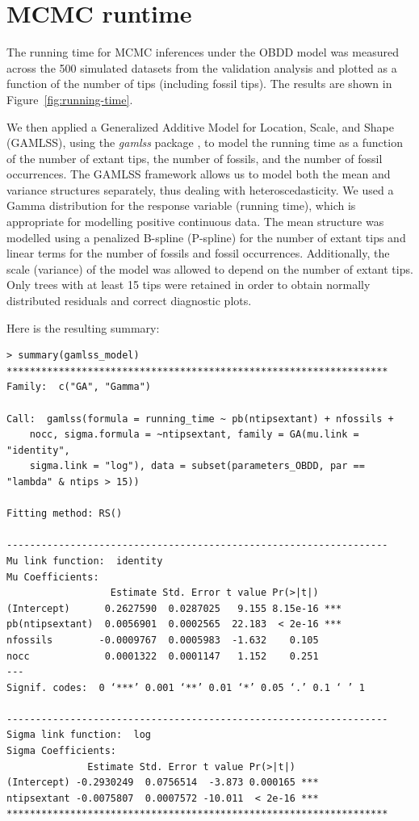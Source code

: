 \documentclass[oupdraft]{sysbio}
\begin{document}
\section{MCMC runtime} \label{SM-runtime}

The running time for MCMC inferences under the OBDD model was measured across the 500 simulated datasets from the validation analysis and plotted as a function of the number of tips (including fossil tips). The results are shown in Figure~\ref{fig:running-time}.

We then applied a Generalized Additive Model for Location, Scale, and Shape (GAMLSS), using the \textit{gamlss} package \citep{rigby_generalized_2005, r_core_team_r_2018}, to model the running time as a function of the number of extant tips, the number of fossils, and the number of fossil occurrences. The GAMLSS framework allows us to model both the mean and variance structures separately, thus dealing with heteroscedasticity. We used a Gamma distribution for the response variable (running time), which is appropriate for modelling positive continuous data. The mean structure was modelled using a penalized B-spline (P-spline) for the number of extant tips and linear terms for the number of fossils and fossil occurrences. Additionally, the scale (variance) of the model was allowed to depend on the number of extant tips. Only trees with at least 15 tips were retained in order to obtain normally distributed residuals and correct diagnostic plots.

Here is the resulting summary:
\begin{verbatim}
> summary(gamlss_model)
******************************************************************
Family:  c("GA", "Gamma") 

Call:  gamlss(formula = running_time ~ pb(ntipsextant) + nfossils +  
    nocc, sigma.formula = ~ntipsextant, family = GA(mu.link = "identity",  
    sigma.link = "log"), data = subset(parameters_OBDD, par == "lambda" & ntips > 15)) 

Fitting method: RS() 

------------------------------------------------------------------
Mu link function:  identity
Mu Coefficients:
                  Estimate Std. Error t value Pr(>|t|)    
(Intercept)      0.2627590  0.0287025   9.155 8.15e-16 ***
pb(ntipsextant)  0.0056901  0.0002565  22.183  < 2e-16 ***
nfossils        -0.0009767  0.0005983  -1.632    0.105    
nocc             0.0001322  0.0001147   1.152    0.251    
---
Signif. codes:  0 ‘***’ 0.001 ‘**’ 0.01 ‘*’ 0.05 ‘.’ 0.1 ‘ ’ 1

------------------------------------------------------------------
Sigma link function:  log
Sigma Coefficients:
              Estimate Std. Error t value Pr(>|t|)    
(Intercept) -0.2930249  0.0756514  -3.873 0.000165 ***
ntipsextant -0.0075807  0.0007572 -10.011  < 2e-16 ***
******************************************************************
\end{verbatim}
\end{document}
